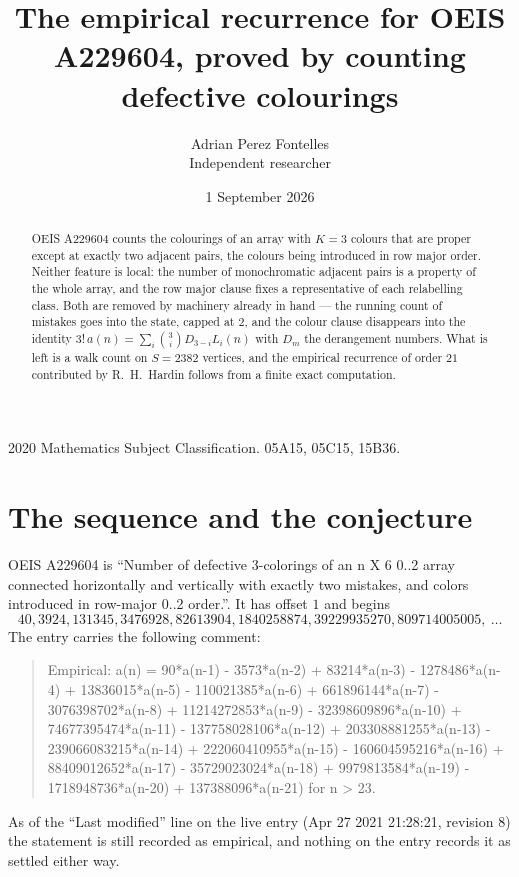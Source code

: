 \documentclass[11pt,a4paper]{article}
\title{The empirical recurrence for OEIS A229604, proved by counting defective colourings}
\author{Adrian Perez Fontelles\\ \small Independent researcher}
\date{1 September 2026}
\theoremstyle{plain}
\theoremstyle{definition}
\begin{document}
\maketitle

\begin{abstract}
OEIS A229604 counts the colourings of an array with $K=3$ colours that are proper except at
exactly two adjacent pairs, the colours being introduced in row
major order. Neither feature is local: the number of monochromatic adjacent pairs is a
property of the whole array, and the row major clause fixes a representative of each
relabelling class. Both are removed by machinery already in hand --- the running count of
mistakes goes into the state, capped at $2$, and the colour clause disappears into the
identity $3!\,a(n)=\sum_i\binom{3}{i}D_{3-i}L_i(n)$ with $D_m$ the derangement
numbers. What is left is a walk count on $S=2382$ vertices, and the empirical recurrence of
order $21$ contributed by R.~H.~Hardin follows from a finite exact computation.
\end{abstract}

\noindent\small 2020 Mathematics Subject Classification. 05A15, 05C15, 15B36.\normalsize

\section{The sequence and the conjecture}

OEIS A229604 is ``Number of defective 3-colorings of an n X 6 0..2 array connected horizontally and vertically with exactly two mistakes, and colors introduced in row-major 0..2 order.''. It has offset $1$ and begins
\[
40, 3924, 131345, 3476928, 82613904, 1840258874, 39229935270, 809714005005,\ \dots
\]
The entry carries the following comment:
\begin{quote}\small
Empirical: a(n) = 90*a(n-1) - 3573*a(n-2) + 83214*a(n-3) - 1278486*a(n-4) + 13836015*a(n-5) - 110021385*a(n-6) + 661896144*a(n-7) - 3076398702*a(n-8) + 11214272853*a(n-9) - 32398609896*a(n-10) + 74677395474*a(n-11) - 137758028106*a(n-12) + 203308881255*a(n-13) - 239066083215*a(n-14) + 222060410955*a(n-15) - 160604595216*a(n-16) + 88409012652*a(n-17) - 35729023024*a(n-18) + 9979813584*a(n-19) - 1718948736*a(n-20) + 137388096*a(n-21) for n > 23.
\end{quote}
As of the ``Last modified'' line on the live entry (Apr 27 2021 21:28:21, revision 8) the statement is
still recorded as empirical, and nothing on the entry records it as settled either way.
\end{document}
